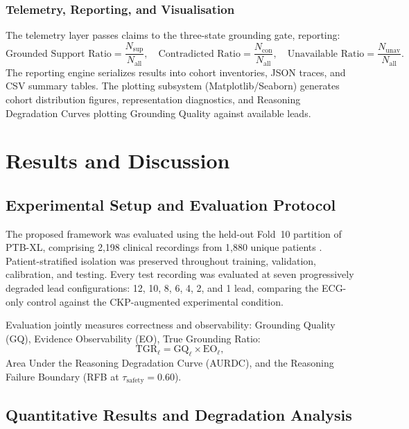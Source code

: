 \documentclass{ssnreview}
\begin{document}
\subsection{Telemetry, Reporting, and Visualisation}

The telemetry layer passes claims to the three-state grounding gate, reporting:
\begin{equation}
  \text{Grounded Support Ratio} = \frac{N_{\mathrm{sup}}}{N_{\mathrm{all}}}, \quad
  \text{Contradicted Ratio} = \frac{N_{\mathrm{con}}}{N_{\mathrm{all}}}, \quad
  \text{Unavailable Ratio} = \frac{N_{\mathrm{unav}}}{N_{\mathrm{all}}}.
\end{equation}
The reporting engine serializes results into cohort inventories, JSON traces, and CSV summary
tables. The plotting subsystem (Matplotlib/Seaborn) generates cohort distribution figures,
representation diagnostics, and Reasoning Degradation Curves plotting Grounding Quality against
available leads.

\chapter{Results and Discussion}

\section{Experimental Setup and Evaluation Protocol}

The proposed framework was evaluated using the held-out Fold~10 partition of PTB-XL,
comprising 2,198 clinical recordings from 1,880 unique patients \cite{ptbxl2020}.
Patient-stratified isolation was preserved throughout training, validation, calibration, and
testing. Every test recording was evaluated at seven progressively degraded lead configurations:
12, 10, 8, 6, 4, 2, and 1 lead, comparing the ECG-only control against the CKP-augmented
experimental condition.

Evaluation jointly measures correctness and observability: Grounding Quality (GQ), Evidence
Observability (EO), True Grounding Ratio:
\begin{equation}
  \mathrm{TGR}_\ell = \mathrm{GQ}_\ell \times \mathrm{EO}_\ell,
  \label{eq:tgr-results}
\end{equation}
Area Under the Reasoning Degradation Curve (AURDC), and the Reasoning Failure Boundary (RFB at
$\tau_{\mathrm{safety}}=0.60$).

\section{Quantitative Results and Degradation Analysis}
\end{document}
